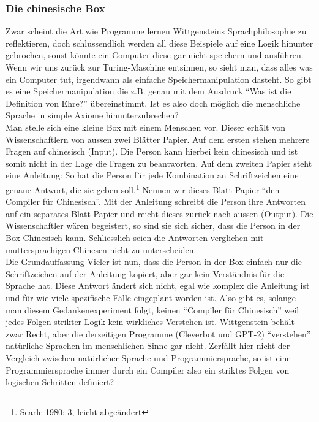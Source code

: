 \documentclass[10pt,a4paper]{article}
\begin{document}
\subsubsection{Die chinesische Box}
Zwar scheint die Art wie Programme lernen Wittgensteins Sprachphilosophie zu reflektieren, doch schlussendlich werden all diese Beispiele auf eine Logik hinunter gebrochen, sonst könnte ein Computer diese gar nicht speichern und ausführen. Wenn wir uns zurück zur Turing-Maschine entsinnen, so sieht man, dass alles was ein Computer tut, irgendwann als einfache Speichermanipulation dasteht. So gibt es eine Speichermanipulation die z.B. genau mit dem Ausdruck \enquote{Was ist die Definition von Ehre?} übereinstimmt. Ist es also doch möglich die menschliche Sprache in simple Axiome hinunterzubrechen? \\
Man stelle sich eine kleine Box mit einem Menschen vor. Dieser erhält von Wissenschaftlern von aussen zwei Blätter Papier. Auf dem ersten stehen mehrere Fragen auf chinesisch (Input). Die Person kann hierbei kein chinesisch und ist somit nicht in der Lage die Fragen zu beantworten. Auf dem zweiten Papier steht eine Anleitung: So hat die Person für jede Kombination an Schriftzeichen eine genaue Antwort, die sie geben soll.\footnote{Searle 1980: 3, leicht abgeändert} Nennen wir dieses Blatt Papier \enquote{den Compiler für Chinesisch}. Mit der Anleitung schreibt die Person ihre Antworten auf ein separates Blatt Papier und reicht dieses zurück nach aussen (Output). Die Wissenschaftler wären begeistert, so sind sie sich sicher, dass die Person in der Box Chinesisch kann. Schliesslich seien die Antworten verglichen mit muttersprachigen Chinesen nicht zu unterscheiden. \\
Die Grundauffassung Vieler ist nun, dass die Person in der Box einfach nur die Schriftzeichen auf der Anleitung kopiert, aber gar kein Verständnis für die Sprache hat. Diese Antwort ändert sich nicht, egal wie komplex die Anleitung ist und für wie viele spezifische Fälle eingeplant worden ist. Also gibt es, solange man diesem Gedankenexperiment folgt, keinen \enquote{Compiler für Chinesisch} weil jedes Folgen strikter Logik kein wirkliches Verstehen ist. Wittgenstein behält zwar Recht, aber die derzeitigen Programme (Cleverbot und GPT-2) \enquote{verstehen} natürliche Sprachen im menschlichen Sinne gar nicht. Zerfällt hier nicht der Vergleich zwischen natürlicher Sprache und Programmiersprache, so ist eine Programmiersprache immer durch ein Compiler also ein striktes Folgen von logischen Schritten definiert?
\end{document}
